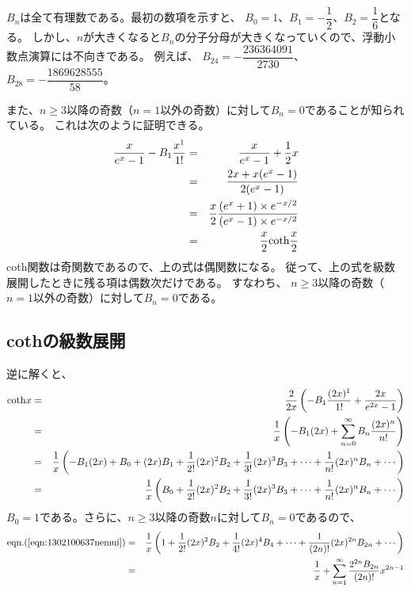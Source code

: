 \documentclass[uplatex,a4j,12pt,dvipdfmx]{jsarticle}
\begin{document}
$B_{n}$は全て有理数である。最初の数項を示すと、
$B_{0}=1$、$B_{1}=-\dfrac{1}{2}$、$B_{2}=\dfrac{1}{6}$となる。
しかし、$n$が大きくなると$B_{n}$の分子分母が大きくなっていくので、浮動小数点演算には不向きである。
例えば、
$B_{24}=-\dfrac{236364091}{2730}$、
$B_{28}=-\dfrac{1869628555}{58}$。

また、$n \geq 3$以降の奇数（$n=1$以外の奇数）に対して$B_{n}=0$であることが知られている。
これは次のように証明できる。
\begin{eqnarray}
	\dfrac{x}{e^{x}-1}
	-
	B_{1}
	\dfrac{x^{1}}{1!}
	&=&
	\dfrac{x}{e^{x}-1}
	+
	\dfrac{1}{2}x
	\nonumber \\ &=&
	\dfrac{2x + x(e^{x} -1)}{2(e^{x}-1)}
	\nonumber \\ &=&
	\dfrac{x}{2}
	\dfrac{(e^{x} +1) \times e^{-x/2}}{(e^{x}-1)\times e^{-x/2}}
	\nonumber \\ &=&
	\dfrac{x}{2}
	{\rm coth}\dfrac{x}{2}
\end{eqnarray}
{\rm coth}関数は奇関数であるので、上の式は偶関数になる。
従って、上の式を級数展開したときに残る項は偶数次だけである。
すなわち、
$n \geq 3$以降の奇数（$n=1$以外の奇数）に対して$B_{n}=0$である。

\subsection{cothの級数展開}

逆に解くと、
\begin{eqnarray}
	{\rm coth}x
	&=&
	\dfrac{2}{2x}
	\left(
	-
	B_{1}
	\dfrac{(2x)^{1}}{1!}
	+
	\dfrac{2x}{e^{2x}-1}
	\right)
	\nonumber \\ &=&
	\dfrac{1}{x}
	\left(
	-B_{1}(2x)
	+
	\sum_{n=0}^{\infty}
	B_{n}
	\dfrac{(2x)^{n}}{n!}
	\right)
	\nonumber \\ &=&
	\dfrac{1}{x}
	\left(
	-B_{1}(2x)
	+
	B_{0}
	+
	(2x)
	B_{1}
	+
	\dfrac{1}{2!}
	(2x)^{2}
	B_{2}
	+
	\dfrac{1}{3!}
	(2x)^{3}
	B_{3}
	+
	\cdots
	+
	\dfrac{1}{n!}
	(2x)^{n}
	B_{n}
	+
	\cdots
	\right)
	\nonumber \\ &=&
	\dfrac{1}{x}
	\left(
	B_{0}
	+
	\dfrac{1}{2!}
	(2x)^{2}
	B_{2}
	+
	\dfrac{1}{3!}
	(2x)^{3}
	B_{3}
	+
	\cdots
	+
	\dfrac{1}{n!}
	(2x)^{n}
	B_{n}
	+
	\cdots
	\right)
	\label{eqn:1302100637nemui}
\end{eqnarray}
$B_{0}=1$である。さらに、$n \geq 3$以降の奇数$n$に対して$B_{n}=0$であるので、
\begin{eqnarray}
	{\rm eqn.}(\ref{eqn:1302100637nemui})
	&=&
	\dfrac{1}{x}
	\left(
	1
	+
	\dfrac{1}{2!}
	(2x)^{2}
	B_{2}
	+
	\dfrac{1}{4!}
	(2x)^{4}
	B_{4}
	+
	\cdots
	+
	\dfrac{1}{(2n)!}
	(2x)^{2n}
	B_{2n}
	+
	\cdots
	\right)
	\nonumber \\ &=&
	\dfrac{1}{x}
	+
	\sum_{n=1}^{\infty}
	\dfrac{
		2^{2n}
		B_{2n}
	}{(2n)!}
	x^{2n-1}
\end{eqnarray}
\end{document}
